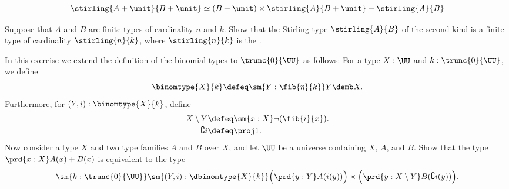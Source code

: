 \begin{exercises}
\begin{subexenum}
  \begin{equation*}
    \stirling{A+\unit}{B+\unit}\simeq (B+\unit)\times\stirling{A}{B+\unit}+\stirling{A}{B}
  \end{equation*}
  \item Suppose that $A$ and $B$ are finite types of cardinality $n$ and $k$. Show that the Stirling type $\stirling{A}{B}$ of the second kind is a finite type of cardinality $\stirling{n}{k}$, where $\stirling{n}{k}$ is the .
  \end{subexenum}
  \exitem \label{ex:distributive-pi-coprod}In this exercise we extend the definition of the binomial types to $\trunc{0}{\UU}$ as follows: For a type $X:\UU$ and $k:\trunc{0}{\UU}$, we define
  \begin{equation*}
    \binomtype{X}{k}\defeq \sm{Y:\fib{\eta}{k}}Y\demb X.
  \end{equation*}
  Furthermore, for $(Y,i):\binomtype{X}{k}$, define
  \begin{align*}
    X\setminus Y & \defeq \sm{x:X}\neg(\fib{i}{x}). \\
    \complement{i} & \defeq \proj 1.
  \end{align*}
  Now consider a type $X$ and two type families $A$ and $B$ over $X$, and let $\UU$ be a universe containing $X$, $A$, and $B$. Show that the type $\prd{x:X}A(x)+B(x)$ is equivalent to the type
  \begin{equation*}
    \sm{k:\trunc{0}{\UU}}\sm{(Y,i):\dbinomtype{X}{k}}\Big(\prd{y:Y}A(i(y))\Big)\times\Big(\prd{y:X\setminus Y}B(\complement{i}(y))\Big).
  \end{equation*}
\end{exercises}

